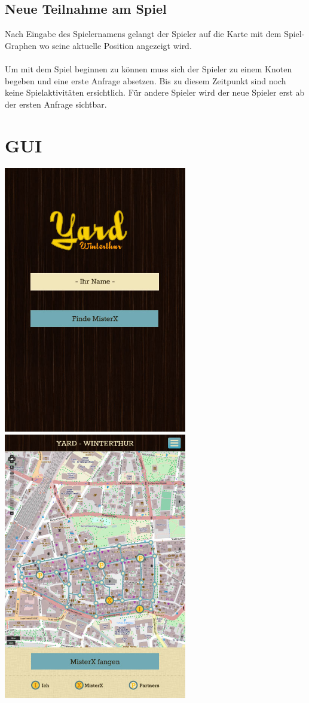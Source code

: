 \documentclass[11pt]{article}
\begin{document}
\subsection{Neue Teilnahme am Spiel}
Nach Eingabe des Spielernamens gelangt der Spieler auf die Karte mit dem Spiel-Graphen wo seine aktuelle Position angezeigt wird.
\\\\
Um mit dem Spiel beginnen zu können muss sich der Spieler zu einem Knoten begeben und eine erste Anfrage absetzen. Bis zu diesem Zeitpunkt sind noch keine Spielaktivitäten ersichtlich.
Für andere Spieler wird der neue Spieler erst ab der ersten Anfrage sichtbar.


\section{GUI}
\includegraphics[width=8cm]{Bilder/homeView.jpg}
\includegraphics[width=8cm]{Bilder/karteView.jpg}
\end{document}
